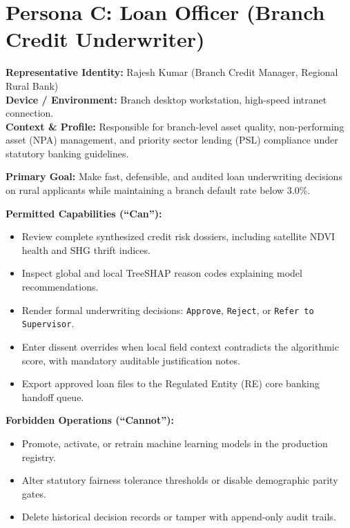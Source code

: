 \documentclass[11pt,a4paper,oneside]{report}
\begin{document}
\section{Persona C: Loan Officer (Branch Credit Underwriter)}
\noindent\textbf{Representative Identity:} Rajesh Kumar (Branch Credit Manager, Regional Rural Bank)\\
\textbf{Device / Environment:} Branch desktop workstation, high-speed intranet connection.\\
\textbf{Context \& Profile:} Responsible for branch-level asset quality, non-performing asset (NPA) management, and priority sector lending (PSL) compliance under statutory banking guidelines.

\vspace{0.2cm}
\noindent\textbf{Primary Goal:} Make fast, defensible, and audited loan underwriting decisions on rural applicants while maintaining a branch default rate below 3.0\%.

\vspace{0.2cm}
\noindent\textbf{Permitted Capabilities (``Can''):}
\begin{itemize}[leftmargin=1.5em, itemsep=1pt]
  \item Review complete synthesized credit risk dossiers, including satellite NDVI health and SHG thrift indices.
  \item Inspect global and local TreeSHAP reason codes explaining model recommendations.
  \item Render formal underwriting decisions: \texttt{Approve}, \texttt{Reject}, or \texttt{Refer to Supervisor}.
  \item Enter dissent overrides when local field context contradicts the algorithmic score, with mandatory auditable justification notes.
  \item Export approved loan files to the Regulated Entity (RE) core banking handoff queue.
\end{itemize}

\noindent\textbf{Forbidden Operations (``Cannot''):}
\begin{itemize}[leftmargin=1.5em, itemsep=1pt]
  \item Promote, activate, or retrain machine learning models in the production registry.
  \item Alter statutory fairness tolerance thresholds or disable demographic parity gates.
  \item Delete historical decision records or tamper with append-only audit trails.
\end{itemize}
\end{document}
